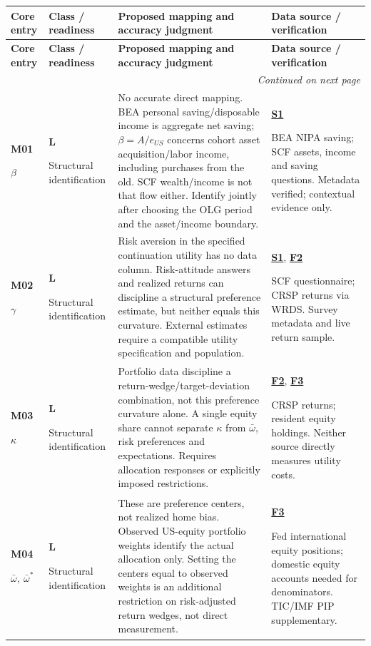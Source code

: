 \documentclass[10pt,a4paper,landscape]{article}
\makeatletter
\newenvironment{measuretable}{%
\fontsize{9.4}{10.8}\selectfont\setlength{\parskip}{1pt}
\begin{longtable}{@{}P{\dimexpr .14\textwidth-4.2pt\relax}P{\dimexpr .135\textwidth-4.05pt\relax}P{\dimexpr .455\textwidth-13.65pt\relax}P{\dimexpr .27\textwidth-8.1pt\relax}@{}}
\toprule\rowcolor{tablehead}\textbf{Core entry} & \textbf{Class / readiness} & \textbf{Proposed mapping and accuracy judgment} & \textbf{Data source / verification}\\\midrule
\endfirsthead
\toprule\rowcolor{tablehead}\textbf{Core entry} & \textbf{Class / readiness} & \textbf{Proposed mapping and accuracy judgment} & \textbf{Data source / verification}\\\midrule
\endhead\midrule\multicolumn{4}{r}{\footnotesize\itshape Continued on next page}\\\endfoot
\bottomrule\endlastfoot
}{\end{longtable}}
\makeatother
\begin{document}
\begin{measuretable}
\textbf{M01}\par $\beta$ & \textbf{L}\par Structural identification & No accurate direct mapping. BEA personal saving/disposable income is aggregate net saving; $\beta=A/e_{US}$ concerns cohort asset acquisition/labor income, including purchases from the old. SCF wealth/income is not that flow either. Identify jointly after choosing the OLG period and the asset/income boundary. & \hyperlink{src-S1}{\textbf{S1}}\par BEA NIPA saving; SCF assets, income and saving questions. Metadata verified; contextual evidence only.\\[4pt]
\textbf{M02}\par $\gamma$ & \textbf{L}\par Structural identification & Risk aversion in the specified continuation utility has no data column. Risk-attitude answers and realized returns can discipline a structural preference estimate, but neither equals this curvature. External estimates require a compatible utility specification and population. & \hyperlink{src-S1}{\textbf{S1}}, \hyperlink{src-F2}{\textbf{F2}}\par SCF questionnaire; CRSP returns via WRDS. Survey metadata and live return sample.\\[4pt]
\textbf{M03}\par $\kappa$ & \textbf{L}\par Structural identification & Portfolio data discipline a return-wedge/target-deviation combination, not this preference curvature alone. A single equity share cannot separate $\kappa$ from $\bar\omega$, risk preferences and expectations. Requires allocation responses or explicitly imposed restrictions. & \hyperlink{src-F2}{\textbf{F2}}, \hyperlink{src-F3}{\textbf{F3}}\par CRSP returns; resident equity holdings. Neither source directly measures utility costs.\\[4pt]
\textbf{M04}\par $\bar\omega,\ \bar\omega^*$ & \textbf{L}\par Structural identification & These are preference centers, not realized home bias. Observed US-equity portfolio weights identify the actual allocation only. Setting the centers equal to observed weights is an additional restriction on risk-adjusted return wedges, not direct measurement. & \hyperlink{src-F3}{\textbf{F3}}\par Fed international equity positions; domestic equity accounts needed for denominators. TIC/IMF PIP supplementary.\\[4pt]

\end{measuretable}
\end{document}
